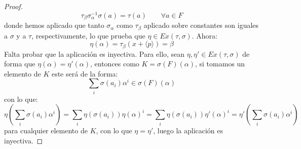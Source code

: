 \begin{prop}[Extensión]
\begin{proof}
\begin{equation*}
            \tau_\beta\sigma_\alpha^{-1}\sigma(a) = \tau(a) \qquad \forall a\in F
        \end{equation*}
        donde hemos aplicado que tanto $\sigma_\alpha$ como $\tau_\beta$ aplicado sobre constantes son iguales a $\sigma$ y a $\tau$, respectivamente, lo que prueba que $\eta\in Ex(\tau,\sigma)$. Ahora:
        \begin{equation*}
            \eta(\alpha) = \tau_\beta(x+\langle p \rangle ) = \beta
        \end{equation*}
        Falta probar que la aplicación es inyectiva. Para ello, sean $\eta,\eta' \in Ex(\tau,\sigma)$ de forma que $\eta(\alpha)=\eta'(\alpha)$, entonces como $K=\sigma(F)(\alpha)$, si tomamos un elemento de $K$ este será de la forma:
        \begin{equation*}
            \sum_{i} \sigma(a_i) \alpha^i \in \sigma(F)(\alpha)
        \end{equation*}
        con lo que:
        \begin{equation*}
            \eta\left(\sum_{i}\sigma(a_i)\alpha^i\right) = \sum_i \eta(\sigma(a_i)) {\eta(\alpha)}^{i} = \sum_i \eta(\sigma(a_i)) {\eta'(\alpha)}^{i} = \eta'\left(\sum_{i}\sigma(a_i)\alpha^i\right) 
        \end{equation*}
        para cualquier elemento de $K$, con lo que $\eta = \eta'$, luego la aplicación es inyectiva.
    \end{proof}
\end{prop}

